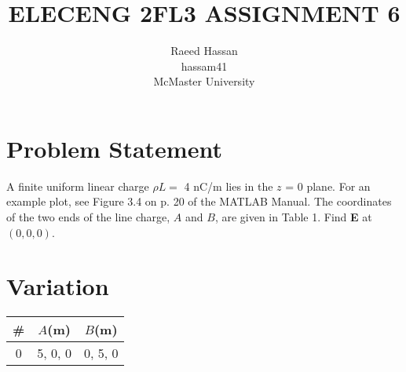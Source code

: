 \documentclass[12pt]{article}
\title{ELECENG 2FL3 ASSIGNMENT 6}
\author{Raeed Hassan \\ hassam41 \\ McMaster University}
\begin{document}
\maketitle
\pagebreak
\setcounter{section}{1}
\section{Problem Statement}
A finite uniform linear charge $\rho L=$ 4 nC/m lies in the $z$ = 0 plane. For an  example  plot, see Figure 3.4 on p. 20 of the MATLAB\textsuperscript{\textregistered} Manual. The coordinates of the two ends of the line charge, $A$ and $B$, are given in Table 1. Find \textbf{E} at $(0, 0 ,0)$.
\section{Variation}
\begin{center}
\begin{tabular}{c|c|c} \hline \hline
    \# & $A$(m) & $B$(m) \\ \hline
    0 & 5, 0, 0 & 0, 5, 0 \\ \hline \hline
\end{tabular}
\end{center}
\end{document}
